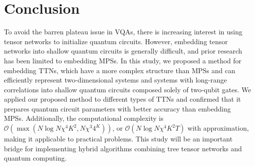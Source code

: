 \documentclass[12pt,dvipdfmx,twoside,openright]{report}
\begin{document}
\chapter{Conclusion}
To avoid the barren plateau issue in VQAs, there is increasing interest in using tensor networks to initialize quantum circuits. 
However, embedding tensor networks into shallow quantum circuits is generally difficult, and prior research has been limited to embedding MPSs.
In this study, we proposed a method for embedding TTNs, which have a more complex structure than MPSs and can efficiently represent two-dimensional systems and systems with long-range correlations into shallow quantum circuits composed solely of two-qubit gates.
We applied our proposed method to different types of TTNs and confirmed that it prepares quantum circuit parameters with better accuracy than embedding MPSs.
Additionally, the computational complexity is $\mathcal{O}(\max (N\log{N}\chi^4 K^2, N\chi^3 4^K))$, or $\mathcal{O}(N\log{N}\chi^4 K^2T)$ with approximation, making it applicable to practical problems.
This study will be an important bridge for implementing hybrid algorithms combining tree tensor networks and quantum computing.



\end{document}

